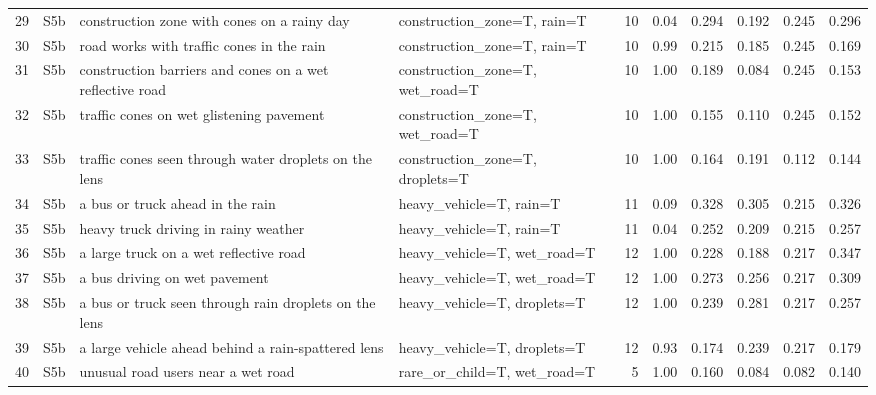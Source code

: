 \begin{longtable}{r l p{4.0cm} p{3.0cm} r r r r r r}
29 & S5b & construction zone with cones on a rainy day & construction\_zone=T, rain=T & 10 & 0.04 & 0.294 & 0.192 & 0.245 & 0.296\\
30 & S5b & road works with traffic cones in the rain & construction\_zone=T, rain=T & 10 & 0.99 & 0.215 & 0.185 & 0.245 & 0.169\\
31 & S5b & construction barriers and cones on a wet reflective road & construction\_zone=T, wet\_road=T & 10 & 1.00 & 0.189 & 0.084 & 0.245 & 0.153\\
32 & S5b & traffic cones on wet glistening pavement & construction\_zone=T, wet\_road=T & 10 & 1.00 & 0.155 & 0.110 & 0.245 & 0.152\\
33 & S5b & traffic cones seen through water droplets on the lens & construction\_zone=T, droplets=T & 10 & 1.00 & 0.164 & 0.191 & 0.112 & 0.144\\
34 & S5b & a bus or truck ahead in the rain & heavy\_vehicle=T, rain=T & 11 & 0.09 & 0.328 & 0.305 & 0.215 & 0.326\\
35 & S5b & heavy truck driving in rainy weather & heavy\_vehicle=T, rain=T & 11 & 0.04 & 0.252 & 0.209 & 0.215 & 0.257\\
36 & S5b & a large truck on a wet reflective road & heavy\_vehicle=T, wet\_road=T & 12 & 1.00 & 0.228 & 0.188 & 0.217 & 0.347\\
37 & S5b & a bus driving on wet pavement & heavy\_vehicle=T, wet\_road=T & 12 & 1.00 & 0.273 & 0.256 & 0.217 & 0.309\\
38 & S5b & a bus or truck seen through rain droplets on the lens & heavy\_vehicle=T, droplets=T & 12 & 1.00 & 0.239 & 0.281 & 0.217 & 0.257\\
39 & S5b & a large vehicle ahead behind a rain-spattered lens & heavy\_vehicle=T, droplets=T & 12 & 0.93 & 0.174 & 0.239 & 0.217 & 0.179\\
40 & S5b & unusual road users near a wet road & rare\_or\_child=T, wet\_road=T & 5 & 1.00 & 0.160 & 0.084 & 0.082 & 0.140\\
\end{longtable}
